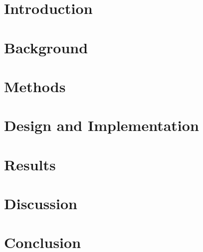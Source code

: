 \section{Introduction}
\label{sec:introduction}

\thispagestyle{empty}



\clearpage

\section{Background}
\label{sec:background}


\clearpage

\section{Methods}
\label{sec:methods}


\clearpage

\section{Design and Implementation}
\label{sec:implementation}


\clearpage

\section{Results}
\label{sec:results}


\clearpage

\section{Discussion}
\label{sec:discussion}


\clearpage

\section{Conclusion}
\label{sec:conclusion}


\clearpage




\clearpage

\thesisappendix


